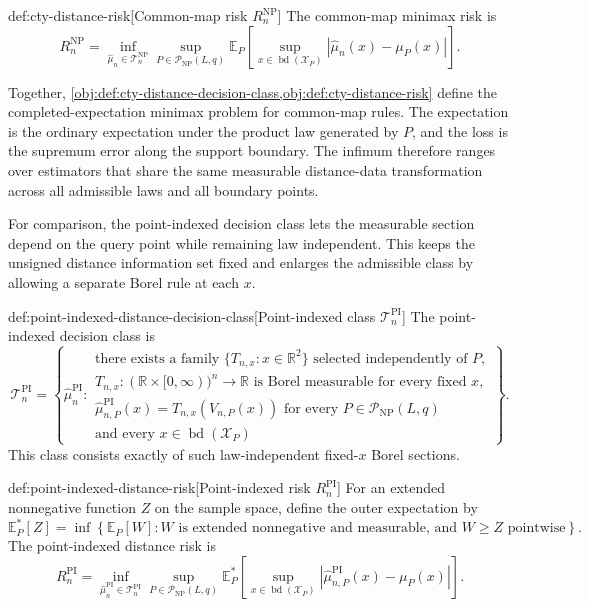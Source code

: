 \documentclass[11pt]{article}
\begin{document}
\begin{definitionv}{def:cty-distance-risk}[Common-map risk $R_n^{\mathrm{NP}}$]
The common-map minimax risk is
\[
R_n^{\mathrm{NP}}
=
\inf_{\widehat\mu_n\in\mathcal T_n^{\mathrm{NP}}}
\sup_{P\in\mathcal P_{\mathrm{NP}}(L,q)}
\mathbb E_P
\left[
\sup_{x\in\operatorname{bd}(\mathcal X_P)}
|\widehat\mu_n(x)-\mu_P(x)|
\right].
\]
\end{definitionv}

Together, \cref{obj:def:cty-distance-decision-class,obj:def:cty-distance-risk} define the completed-expectation minimax problem for common-map rules. The expectation is the ordinary expectation under the product law generated by \(P\), and the loss is the supremum error along the support boundary. The infimum therefore ranges over estimators that share the same measurable distance-data transformation across all admissible laws and all boundary points.

For comparison, the point-indexed decision class lets the measurable section depend on the query point while remaining law independent. This keeps the unsigned distance information set fixed and enlarges the admissible class by allowing a separate Borel rule at each \(x\).

\begin{definitionv}{def:point-indexed-distance-decision-class}[Point-indexed class $\mathcal T_n^{\mathrm{PI}}$]
The point-indexed decision class is
\[
\mathcal T_n^{\mathrm{PI}}
=
\left\{
\widehat\mu_n^{\mathrm{PI}}:
\begin{array}{l}
\text{there exists a family }\{T_{n,x}:x\in\mathbb R^2\}
\text{ selected independently of }P,\\
T_{n,x}:(\mathbb R\times[0,\infty))^n\to\mathbb R
\text{ is Borel measurable for every fixed }x,\\
\widehat\mu_{n,P}^{\mathrm{PI}}(x)=T_{n,x}(V_{n,P}(x))
\text{ for every }P\in\mathcal P_{\mathrm{NP}}(L,q)\\
\text{and every }x\in\operatorname{bd}(\mathcal X_P)
\end{array}
\right\}.
\]
This class consists exactly of such law-independent fixed-\(x\) Borel sections.
\end{definitionv}

\begin{definitionv}{def:point-indexed-distance-risk}[Point-indexed risk \(R_n^{\mathrm{PI}}\)]
For an extended nonnegative function \(Z\) on the sample space, define the outer expectation by
\[
\mathbb E_P^*[Z]
=
\inf\left\{
\mathbb E_P[W]:
W\text{ is extended nonnegative and measurable, and }W\geq Z\text{ pointwise}
\right\}.
\]
The point-indexed distance risk is
\[
R_n^{\mathrm{PI}}
=
\inf_{\widehat\mu_n^{\mathrm{PI}}\in\mathcal T_n^{\mathrm{PI}}}
\sup_{P\in\mathcal P_{\mathrm{NP}}(L,q)}
\mathbb E_P^*\!\left[
\sup_{x\in\operatorname{bd}(\mathcal X_P)}
\left|\widehat\mu_{n,P}^{\mathrm{PI}}(x)-\mu_P(x)\right|
\right].
\]
\end{definitionv}
\end{document}
